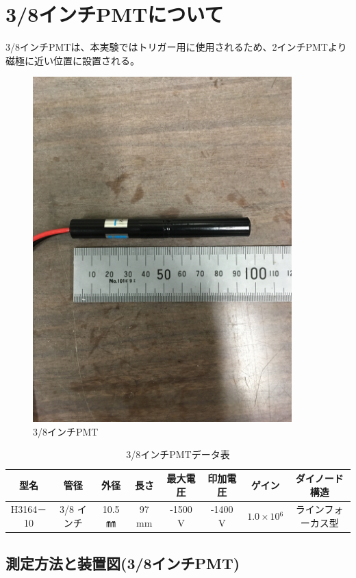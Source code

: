 \section{3/8インチPMTについて}
3/8インチPMTは、本実験ではトリガー用に使用されるため、2インチPMTより磁極に近い位置に設置される。
\begin{figure}[H]
	\centering
		\includegraphics[width=10cm]{fig/iguchi/miniPMT.jpg}
	\caption{3/8インチPMT}
	\label{3/8inch}
\end{figure}
\begin{table}[htb]
	\centering
	
	  \begin{tabular}{cccccccc} \hline
		型名& 管径 & 外径 & 長さ & 最大電圧 & 印加電圧 & ゲイン & ダイノード構造 \\ \hline \hline
		H3164－10 & 3/8 インチ & 10.5 ㎜ & 97 mm & -1500 V & -1400 V & $1.0\times10{^{6}}$ &ラインフォーカス型 \\ \hline
	\end{tabular}
	  \caption{3/8インチPMTデータ表}
\end{table}


\subsection{測定方法と装置図(3/8インチPMT)}

